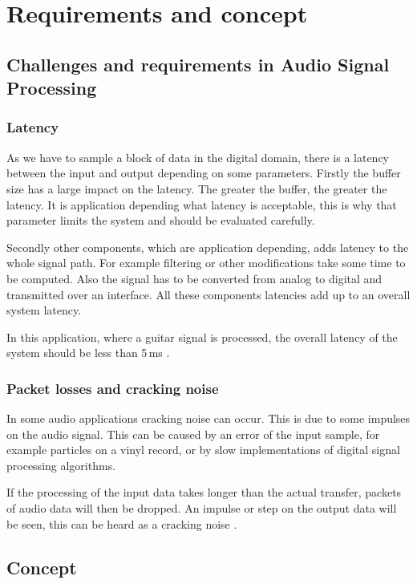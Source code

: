 \section{Requirements and concept}

\subsection{Challenges and requirements in Audio Signal Processing}

\subsubsection{Latency}

As we have to sample a block of data in the digital domain, there is a latency between the input and output
depending on some parameters. Firstly the buffer size has a large impact on the latency. The greater the buffer, the
greater the latency. It is application depending what latency is acceptable, this is why that parameter
limits the system and should be evaluated carefully.

Secondly other components, which are application depending, adds latency to the whole signal path.
For example filtering or other modifications take some time to be computed. Also the signal has to
be converted from analog to digital and transmitted over an interface. All these components latencies add
up to an overall system latency. 

In this application, where a guitar signal is processed, the overall latency of the system should be less
than 5\,ms \cite{beckmann_dsp}.

\subsubsection{Packet losses and cracking noise}

In some audio applications cracking noise can occur. This is due to
some impulses on the audio signal. This can be caused by an error of the input sample, for example particles
on a vinyl record, or by slow implementations of digital signal processing algorithms.

If the processing of the input data takes longer than the actual transfer, packets of audio data will
then be dropped. An impulse or step on the output data will be seen, this can be heard as a cracking noise
\cite{stotz_audio_video}.

\subsection{Concept}

